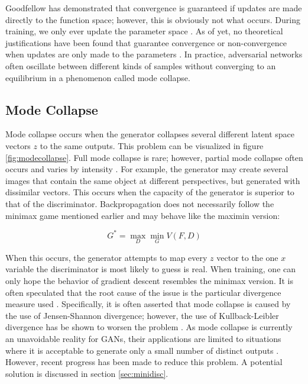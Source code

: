 \documentclass[11pt]{article}
\begin{document}
Goodfellow has demonstrated that convergence is guaranteed if updates are made directly to the function space; however, this is obviously not what occurs. During training, we only ever update the parameter space \citep{2014arXiv1406.2661G}. As of yet, no theoretical justifications have been found that guarantee convergence or non-convergence when updates are only made to the parameters \citep{2017arXiv170100160G}. In practice, adversarial networks often oscillate between different kinds of samples without converging to an equilibrium in a phenomenon called mode collapse.

\subsection{Mode Collapse}
Mode collapse occurs when the generator collapses several different latent space vectors $z$ to the same outputs. This problem can be visualized in figure \ref{fig:modecollapse}. Full mode collapse is rare; however, partial mode collapse often occurs and varies by intensity \citep{2017arXiv170100160G}. For example, the generator may create several images that contain the same object at different perspectives, but generated with dissimilar vectors. This occurs when the capacity of the generator is superior to that of the discriminator. Backpropagation does not necessarily follow the minimax game mentioned earlier and may behave like the maximin version:

$$G^* = \max_{D}\min_{G}V(F, D)$$

When this occurs, the generator attempts to map every $z$ vector to the one $x$ variable the discriminator is most likely to guess is real. When training, one can only hope the behavior of gradient descent resembles the minimax version. It is often speculated that the root cause of the issue is the particular divergence measure used \citep{2017arXiv170100160G}. Specifically, it is often asserted that mode collapse is caused by the use of Jensen-Shannon divergence; however, the use of Kullback-Leibler divergence has be shown to worsen the problem \citep{2017arXiv170100160G}. As mode collapse is currently an unavoidable reality for GANs, their applications are limited to situations where it is acceptable to generate only a small number of distinct outputs \citep{2017arXiv170100160G}. However, recent progress has been made to reduce this problem. A potential solution is discussed in section \ref{sec:minidisc}.
\end{document}
